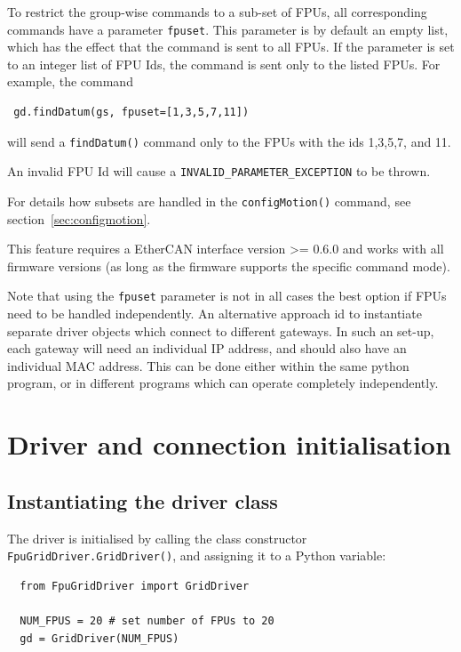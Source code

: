 \documentclass[fontsize=12,a4paper]{scrreprt}
\begin{document}
To restrict the group-wise commands to a sub-set of FPUs, all
corresponding commands have a parameter \texttt{fpuset}.  This
parameter is by default an empty list, which has the effect that the
command is sent to all FPUs. If the parameter is set to an integer
list of FPU Ids, the command is sent only to the listed FPUs.
For example, the command

\begin{verbatim}
 gd.findDatum(gs, fpuset=[1,3,5,7,11])
\end{verbatim}
will send a \texttt{findDatum()} command only to the FPUs with the ids
1,3,5,7, and 11.

An invalid FPU Id will cause a \texttt{INVALID\_PARAMETER\_EXCEPTION}
to be thrown.

For details how subsets are handled in the \texttt{configMotion()}
command, see section~\ref{sec:configmotion}.

This feature requires a EtherCAN interface version >= 0.6.0 and works with all
firmware versions (as long as the firmware supports the specific
command mode).

Note that using the \texttt{fpuset} parameter is not in all cases the
best option if FPUs need to be handled independently. An alternative
approach id to instantiate separate driver objects which connect to
different gateways. In such an set-up, each gateway will need an
individual IP address, and should also have an individual MAC
address. This can be done either within the same python program, or in
different programs which can operate completely independently.


\chapter{Driver and connection initialisation}
\label{sec:driverinitialisation}

\minitoc

\section{Instantiating the driver class}

The driver is initialised by calling the class constructor
\texttt{FpuGridDriver.GridDriver()}, and assigning it to a Python
variable:

\begin{verbatim}
  from FpuGridDriver import GridDriver

  NUM_FPUS = 20 # set number of FPUs to 20
  gd = GridDriver(NUM_FPUS)
\end{verbatim}
\end{document}
